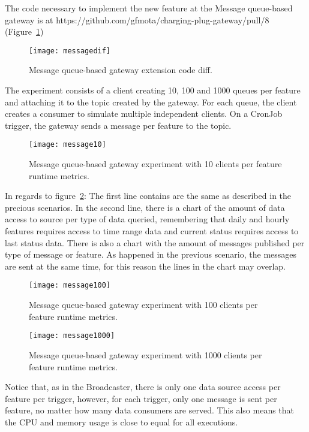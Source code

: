 The code necessary to implement the new feature at the Message queue-based gateway is at https://github.com/gfmota/charging-plug-gateway/pull/8 (Figure~\ref{fig:messagedif})

\begin{figure}
    \centering
    \texttt{[image: messagedif]}
    \caption{Message queue-based gateway extension code diff.\label{fig:messagedif}}
\end{figure}

The experiment consists of a client creating 10, 100 and 1000 queues per feature and attaching it to the topic created by the gateway. For each queue, the client creates a consumer to simulate multiple independent clients. On a CronJob trigger, the gateway sends a message per feature to the topic.

\begin{figure}
    \centering
    \texttt{[image: message10]}
    \caption{Message queue-based gateway experiment with 10 clients per feature runtime metrics.\label{fig:message10}}
\end{figure}

In regards to figure~\ref{fig:message10}: The first line contains are the same as described in the precious scenarios. In the second line, there is a chart of the amount of data access to source per type of data queried, remembering that daily and hourly features requires access to time range data and current status requires access to last status data. There is also a chart with the amount of messages published per type of message or feature. As happened in the previous scenario, the messages are sent at the same time, for this reason the lines in the chart may overlap.

\begin{figure}
    \centering
    \texttt{[image: message100]}
    \caption{Message queue-based gateway experiment with 100 clients per feature runtime metrics.\label{fig:message100}}
\end{figure}

\begin{figure}
    \centering
    \texttt{[image: message1000]}
    \caption{Message queue-based gateway experiment with 1000 clients per feature runtime metrics.\label{fig:message1000}}
\end{figure}

Notice that, as in the Broadcaster, there is only one data source access per feature per trigger, however, for each trigger, only one message is sent per feature, no matter how many data consumers are served. This also means that the CPU and memory usage is close to equal for all executions.

